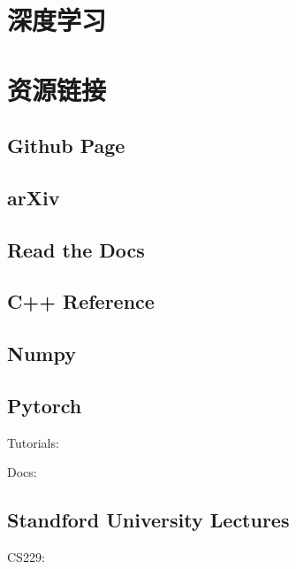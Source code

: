 \documentclass[letterpaper,10pt,english]{sphinxmanual}
\begin{document}
\chapter{深度学习}
\label{\detokenize{deepLearning/index::doc}}\label{\detokenize{deepLearning/index:id1}}

\chapter{资源链接}
\label{\detokenize{link/index::doc}}\label{\detokenize{link/index:id1}}

\section{Github Page}
\label{\detokenize{link/index:github-page}}


\section{arXiv}
\label{\detokenize{link/index:arxiv}}


\section{Read the Docs}
\label{\detokenize{link/index:read-the-docs}}


\section{C++ Reference}
\label{\detokenize{link/index:c-reference}}


\section{Numpy}
\label{\detokenize{link/index:numpy}}


\section{Pytorch}
\label{\detokenize{link/index:pytorch}}
Tutorials: 

Docs: 


\section{Standford University Lectures}
\label{\detokenize{link/index:standford-university-lectures}}
CS229: 
\end{document}
